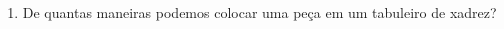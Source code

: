 \documentclass[a4paper,14pt]{article}
\begin{document}
\begin{multicols}{2}
\begin{enumerate}
			\item De quantas maneiras podemos colocar uma peça em um tabuleiro de xadrez?
		\end{enumerate}
		$~$ \\ 	$~$ \\ 	$~$ \\ 	$~$ \\ 	$~$ \\ 	$~$ \\ 	$~$ \\ 	$~$ \\ 	$~$ \\ 	$~$ \\ 	$~$ \\ 	$~$ \\ 	$~$ \\ 	$~$ \\ 	$~$ \\ 
	\end{multicols}
\end{document}
